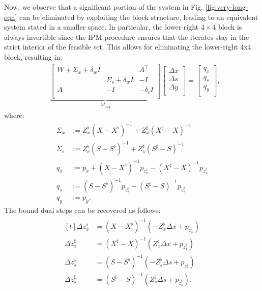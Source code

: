 Now, we observe that a significant portion of the system in Fig.
\eqref{fig:very-long-eqn} can be eliminated by exploiting the block
structure, leading to an equivalent system stated in a smaller
space. In particular, the lower-right $4\times 4$ block is always
invertible since the IPM procedure ensures that the iterates stay in
the strict interior of the feasible set. This allows for eliminating
the lower-right 4x4 block, resulting in:
\begin{align}\label{eqn:very-long-reduced}
  &
    \underbrace{
    \begin{bmatrix}
      W  + \Sigma_x + \delta_w I & & A^{\top} \\
      & \Sigma_s + \delta_w I & -I\\
      A& -I & -\delta_c I\\
    \end{bmatrix}
  }_{M_{\text{aug}}}
  \begin{bmatrix}
    \Delta x \\
    \Delta s \\
    \Delta y \\
  \end{bmatrix}=
  \begin{bmatrix}
    q_x \\
    q_s\\
    q_y\\
  \end{bmatrix},
\end{align}
where:
\begin{align*}
  \Sigma_x&:= Z^\flat_x (X-X^\flat)^{-1}+ Z^\sharp_x (X^\sharp-X)^{-1}\\
  \Sigma_s&:= Z^\flat_s (S-S^\flat)^{-1}+ Z^\sharp_s (S^\sharp-S)^{-1}\\
  q_x&:=p_x + (X-X^\flat)^{-1} p_{z^\flat_x}-  (X^\sharp-X)^{-1} p_{z^\sharp_x}\\
  q_s&:= (S-S^\flat)^{-1} p_{z^\flat_s}-  (S^\sharp-S)^{-1} p_{z^\sharp_s}\\
  q_y&:=p_y.
\end{align*}
The bound dual steps can be recovered as follows:
\begin{align}\label{eqn:recover-1}
  \begin{aligned}[t]
    \Delta z^\flat_x &= \left(X-X^\flat\right)^{-1} \left(-Z^\flat_x \Delta x  + p_{z^\flat_x}\right)\\
    \Delta z^\sharp_x &= \left(X^\sharp-X\right)^{-1} \left(Z^\sharp_x \Delta x  + p_{z^\sharp_x}\right)\\
    \Delta z^\flat_s &= \left(S-S^\flat\right)^{-1} \left(-Z^\flat_s \Delta s  + p_{z^\flat_s}\right)\\
    \Delta z^\sharp_s &= \left(S^\sharp-S\right)^{-1} \left(Z^\sharp_s \Delta s  + p_{z^\sharp_s}\right).
  \end{aligned}
\end{align}
